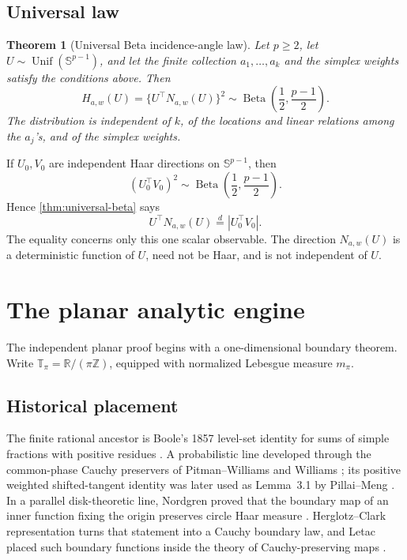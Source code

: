 \documentclass[11pt]{article}
\numberwithin{equation}{section}
\theoremstyle{thmstyleone}%
\newtheorem{theorem}{Theorem}[section]
\theoremstyle{thmstyletwo}%
\let\cref\autoref
\newcommand{\R}{\mathbb R}
\newcommand{\sphere}{\mathbb S}
\newcommand{\Beta}{\operatorname{Beta}}
\newcommand{\Unif}{\operatorname{Unif}}
\begin{document}
\subsection{Universal law}

\begin{theorem}[Universal Beta incidence-angle law]
\label{thm:universal-beta}
Let \(p\geq2\), let \(U\sim\Unif(\sphere^{p-1})\), and let the finite
collection \(a_1,\ldots,a_k\) and the simplex weights satisfy the conditions
above.  Then
\begin{equation}
  H_{a,w}(U)
  =\bigl\{U^\top N_{a,w}(U)\bigr\}^2
  \sim\Beta\!\left(\frac12,\frac{p-1}{2}\right).
  \label{eq:universal-beta}
\end{equation}
The distribution is independent of \(k\), of the locations and linear
relations among the \(a_j\)'s, and of the simplex weights.
\end{theorem}

If \(U_0,V_0\) are independent Haar directions on \(\sphere^{p-1}\), then
\begin{equation}
  (U_0^\top V_0)^2
  \sim\Beta\!\left(\frac12,\frac{p-1}{2}\right).
  \label{eq:independent-incidence}
\end{equation}
Hence \cref{thm:universal-beta} says
\begin{equation}
  U^\top N_{a,w}(U)
  \overset{d}{=}|U_0^\top V_0|.
  \label{eq:dependent-mimics-independent}
\end{equation}
The equality concerns only this one scalar observable.  The direction
\(N_{a,w}(U)\) is a deterministic function of \(U\), need not be Haar, and is
not independent of \(U\).

\section{The planar analytic engine}
\label{sec:planar-engine}

The independent planar proof begins with a one-dimensional boundary theorem.
Write
\(\mathbb T_\pi=\R/(\pi\mathbb Z)\), equipped with normalized Lebesgue
measure \(m_\pi\).

\subsection{Historical placement}

The finite rational ancestor is Boole's 1857 level-set identity for sums of
simple fractions with positive residues \cite{boole-1857}.  A probabilistic
line developed through the common-phase Cauchy preservers of Pitman--Williams
and Williams \cite{pitman-williams-1967,williams-1969}; its positive weighted
shifted-tangent identity was later used as Lemma~3.1 by Pillai--Meng
\cite{pillai-meng-2016}.  In a parallel disk-theoretic line, Nordgren proved
that the boundary map of an inner function fixing the origin preserves circle
Haar measure \cite{nordgren-1968}.  Herglotz--Clark representation turns that
statement into a Cauchy boundary law, and Letac placed such boundary functions
inside the theory of Cauchy-preserving maps
\cite{clark-1972,letac-1977,cima-matheson-ross-2006}.
\end{document}
